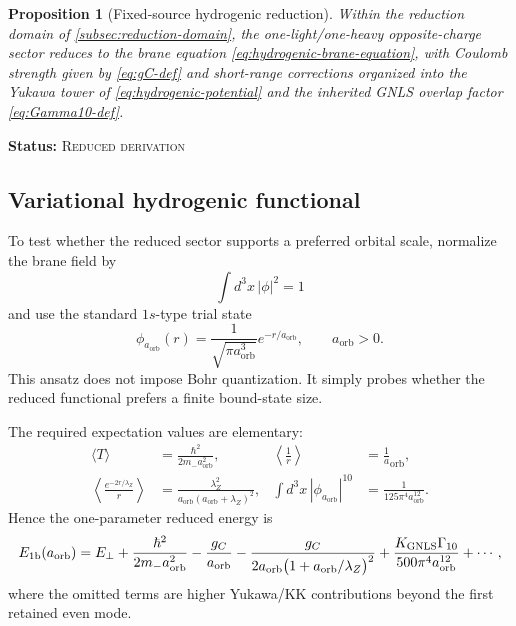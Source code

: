 \documentclass[11pt]{article}
\theoremstyle{plain}
\newtheorem{proposition}[theorem]{Proposition}
\theoremstyle{definition}
\theoremstyle{remark}
\newcommand{\statusReduced}{\textsc{Reduced derivation}}
\newcommand{\claimstatus}[1]{\par\smallskip\noindent\textbf{Status:} #1\par\smallskip}
\newcommand{\aorb}{a_{\mathrm{orb}}}
\begin{document}
\begin{proposition}[Fixed-source hydrogenic reduction]\label{prop:fixed-source-hydrogenic}
Within the reduction domain of \cref{subsec:reduction-domain}, the one-light/one-heavy opposite-charge sector reduces to the brane equation \cref{eq:hydrogenic-brane-equation}, with Coulomb strength given by \cref{eq:gC-def} and short-range corrections organized into the Yukawa tower of \cref{eq:hydrogenic-potential} and the inherited GNLS overlap factor \cref{eq:Gamma10-def}.
\end{proposition}
\claimstatus{\statusReduced}

\subsection{Variational hydrogenic functional}\label{subsec:variational-hydrogenic-functional}

To test whether the reduced sector supports a preferred orbital scale, normalize the brane field by
\begin{equation}
\int d^3x\,|\phi|^2=1
\label{eq:phi-normalization}
\end{equation}
and use the standard $1s$-type trial state
\begin{equation}
\phi_{\aorb}(r)=\frac{1}{\sqrt{\pi\aorb^3}}e^{-r/\aorb},
\qquad \aorb>0.
\label{eq:trial-1s}
\end{equation}
This ansatz does not impose Bohr quantization. It simply probes whether the reduced functional prefers a finite bound-state size.

The required expectation values are elementary:
\begin{align}
\bigl\langle T\bigr\rangle
&=\frac{\hbar^2}{2m_-\aorb^2},
&
\left\langle \frac1r\right\rangle
&=\frac1\aorb,
\label{eq:hydrogenic-basic-expectations}
\\[0.5ex]
\left\langle \frac{e^{-2r/\lambda_Z}}{r}\right\rangle
&=\frac{\lambda_Z^2}{\aorb(\aorb+\lambda_Z)^2},
&
\int d^3x\,|\phi_{\aorb}|^{10}
&=\frac{1}{125\pi^4\aorb^{12}}.
\label{eq:hydrogenic-correction-expectations}
\end{align}
Hence the one-parameter reduced energy is
\begin{equation}
E_{1\rm b}(\aorb)
=
E_\perp
+\frac{\hbar^2}{2m_-\aorb^2}
-\frac{g_C}{\aorb}
-\frac{g_C}{2\aorb\bigl(1+\aorb/\lambda_Z\bigr)^2}
+\frac{K_{\rm GNLS}\Gamma_{10}}{500\pi^4\aorb^{12}}
+\cdots,
\label{eq:hydrogenic-functional}
\end{equation}
where the omitted terms are higher Yukawa/KK contributions beyond the first retained even mode.
\end{document}
